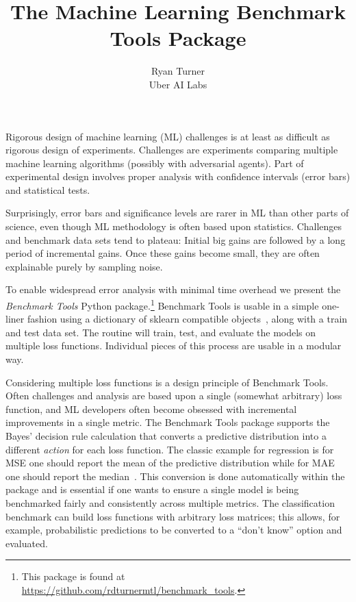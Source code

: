\documentclass{article}
\title{The Machine Learning Benchmark Tools Package}
\author{
  Ryan Turner \\
  Uber AI Labs
}
\begin{document}

\maketitle

\vspace{-5mm}

Rigorous design of machine learning (ML) challenges is at least as difficult as rigorous design of experiments.
Challenges are experiments comparing multiple machine learning algorithms (possibly with adversarial agents)\@.
Part of experimental design involves proper analysis with confidence intervals (error bars) and statistical tests.

Surprisingly, error bars and significance levels are rarer in ML than other parts of science, even though ML methodology is often based upon statistics.
Challenges and benchmark data sets tend to plateau: Initial big gains are followed by a long period of incremental gains.
Once these gains become small, they are often explainable purely by sampling noise.

To enable widespread error analysis with minimal time overhead we present the \emph{Benchmark Tools} Python package.\footnote{This package is found at
\url{https://github.com/rdturnermtl/benchmark_tools}.}
Benchmark Tools is usable in a simple one-liner fashion using a dictionary of sklearn compatible objects~\citep{Pedregosa2011}, along with a train and test data set.
The routine will train, test, and evaluate the models on multiple loss functions.
Individual pieces of this process are usable in a modular way.

Considering multiple loss functions is a design principle of Benchmark Tools.
Often challenges and analysis are based upon a single (somewhat arbitrary) loss function, and ML developers often become obsessed with incremental improvements in a single metric.
The Benchmark Tools package supports the Bayes' decision rule calculation that converts a predictive distribution into a different \emph{action} for each loss function.
The classic example for regression is for MSE one should report the mean of the predictive distribution while for MAE one should report the median~\citep{Marchini2013}.
This conversion is done automatically within the package and is essential if one wants to ensure a single model is being benchmarked fairly and consistently across multiple metrics.
The classification benchmark can build loss functions with arbitrary loss matrices; this allows, for example, probabilistic predictions to be converted to a ``don't know'' option and evaluated.
\end{document}
